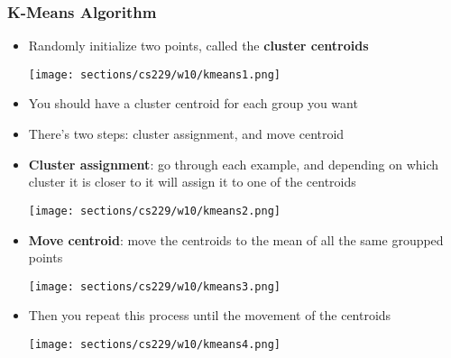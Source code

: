 \subsubsection{K-Means Algorithm}
\begin{itemize}[--]
	\item Randomly initialize two points, called the \textbf{cluster centroids}
	\begin{center}
		\texttt{[image: sections/cs229/w10/kmeans1.png]}
	\end{center}

	\item You should have a cluster centroid for each group you want 
	\item There's two steps: cluster assignment, and move centroid
	\item \textbf{Cluster assignment}: go through each example, and depending on which cluster it is closer to it will assign it to one of the centroids
	\begin{center}
		\texttt{[image: sections/cs229/w10/kmeans2.png]}
	\end{center}
	\item \textbf{Move centroid}: move the centroids to the mean of all the same groupped points
	\begin{center}
		\texttt{[image: sections/cs229/w10/kmeans3.png]}
	\end{center}

	\item Then you repeat this process until the movement of the centroids
	\begin{center}
		\texttt{[image: sections/cs229/w10/kmeans4.png]}
	\end{center}


\end{itemize}
